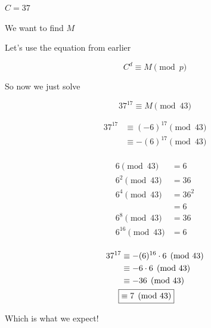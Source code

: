 \documentclass[../../Main.tex]{subfiles}
\begin{document}
\begin{definition}
\begin{example}
        $C = 37$

        We want to find $M$

        Let's use the equation from earlier

        $$C^d \equiv M \pmod{p}$$

        So now we just solve

        $$37^{17} \equiv M \pmod{43}$$

        \begin{align*}
            37^{17} &\equiv (-6)^{17} \pmod{43} \\
            &\equiv - (6)^{17} \pmod{43} \\
        \end{align*}

        \begin{align*}
            6 \pmod{43} &= 6 \\
            6^2 \pmod{43} &= 36 \\
            6^4 \pmod{43} &= 36^2 \\
            &= 6 \\
            6^8 \pmod{43} &= 36 \\
            6^{16} \pmod{43} &= 6 \\
        \end{align*}

        \begin{align*}
            37^{17} &\equiv - (6)^{16} \cdot 6 \pmod{43} \\
            &\equiv -6 \cdot 6 \pmod{43} \\
            &\equiv -36 \pmod{43} \\
            \Aboxed{&\equiv 7 \pmod{43}} \\
        \end{align*}

        Which is what we expect!

    \end{example}
    
\end{definition}
\end{document}
